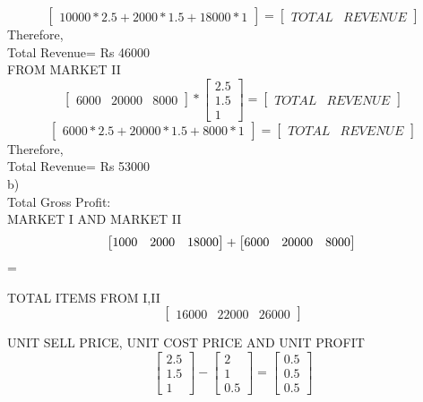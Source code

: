 \documentclass{article}
\begin{document}
\begin{itemize}
\[\]
 
 \[
\begin{bmatrix}
  10000*2.5+2000*1.5+18000*1
 \end{bmatrix}
 =
 \begin{bmatrix}
        TOTAL & REVENUE
 \end{bmatrix}
 \]
 Therefore,\\
 
 Total Revenue= Rs 46000\\
 
 FROM MARKET II\\
 
 
 \[
\begin{bmatrix}
   6000 & 20000 & 8000            
 \end{bmatrix} 
      *
 \begin{bmatrix}
        2.5\\
        1.5\\
        1
 \end{bmatrix}
 =
\begin{bmatrix}
       TOTAL & REVENUE
 \end{bmatrix} 
\]
 \[
\begin{bmatrix}
  6000*2.5+20000*1.5+8000*1
 \end{bmatrix}
 =
 \begin{bmatrix}
        TOTAL & REVENUE
 \end{bmatrix}
 \]
Therefore,\\
 Total Revenue= Rs 53000\\
 \newpage
 b)\\
 
Total Gross Profit:\\
MARKET I AND MARKET II\\
 \[
\begin{bmatrix}
  1000 & 2000 & 18000
 \end{bmatrix}
 +
 \begin{bmatrix}
  6000 & 20000 & 8000 
 \end{bmatrix}\\
 \]
 =

TOTAL ITEMS FROM I,II\\
\[
 \begin{bmatrix}
  16000 & 22000 & 26000 
 \end{bmatrix} 
 \]

 UNIT SELL PRICE, UNIT COST PRICE AND UNIT PROFIT\\
 \[
\begin{bmatrix}
   2.5\\ 
   1.5\\ 
   1           
 \end{bmatrix} 
      -
 \begin{bmatrix}
        2\\
        1\\
        0.5
 \end{bmatrix}
 =
\begin{bmatrix}
       0.5\\
       0.5\\
       0.5
 \end{bmatrix} 
\]


\end{itemize}
\end{document}
